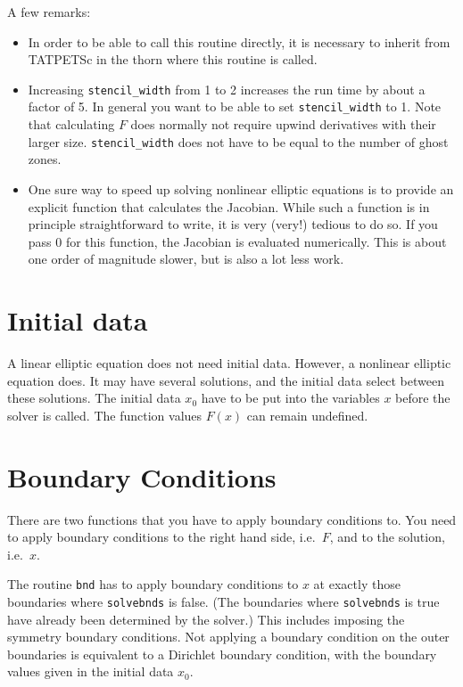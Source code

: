 \documentclass[12pt]{article}
\begin{document}
A few remarks:
\begin{itemize}

   \item In order to be able to call this routine directly, it is
   necessary to inherit from TATPETSc in the thorn where this routine
   is called.
  
   \item Increasing \texttt{stencil\_width} from 1 to 2 increases the
   run time by about a factor of 5.  In general you want to be able to
   set \texttt{stencil\_width} to 1.  Note that calculating $F$ does
   normally not require upwind derivatives with their larger size.
   \texttt{stencil\_width} does not have to be equal to the number of
   ghost zones.
  
   \item One sure way to speed up solving nonlinear elliptic equations
   is to provide an explicit function that calculates the Jacobian.
   While such a function is in principle straightforward to write, it
   is very (very!) tedious to do so.  If you pass 0 for this function,
   the Jacobian is evaluated numerically.  This is about one order of
   magnitude slower, but is also a lot less work.
\end{itemize}

\section{Initial data}

A linear elliptic equation does not need initial data.  However, a
nonlinear elliptic equation does.  It may have several solutions, and
the initial data select between these solutions.  The initial data
$x_0$ have to be put into the variables $x$ before the solver is
called.  The function values $F(x)$ can remain undefined.

\section{Boundary Conditions}

There are two functions that you have to apply boundary conditions to.
You need to apply boundary conditions to the right hand side, i.e.\
$F$, and to the solution, i.e.\ $x$.

The routine \texttt{bnd} has to apply boundary conditions to $x$ at
exactly those boundaries where \texttt{solvebnds} is false.  (The
boundaries where \texttt{solvebnds} is true have already been
determined by the solver.)  This includes imposing the symmetry
boundary conditions.  Not applying a boundary condition on the outer
boundaries is equivalent to a Dirichlet boundary condition, with the
boundary values given in the initial data $x_0$.
\end{document}
